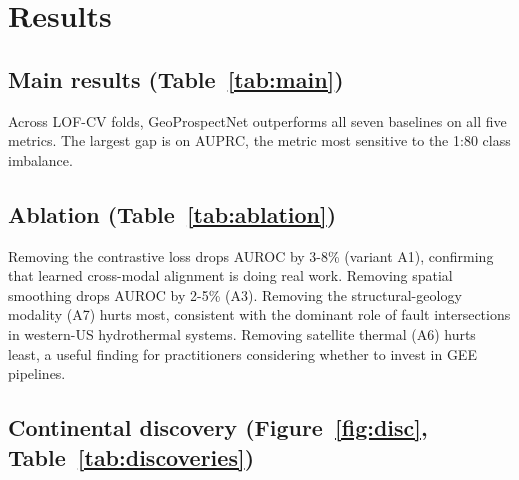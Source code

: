 \documentclass[review,12pt]{elsarticle}
\begin{document}
\section{Results}
\label{sec:results}

\subsection{Main results (Table~\ref{tab:main})}

Across LOF-CV folds, GeoProspectNet outperforms all seven baselines on all five metrics. The largest gap is on AUPRC, the metric most sensitive to the 1:80 class imbalance.

\begin{table}[h]
\centering
\caption{Leave-one-field-cluster-out cross-validation results, mean $\pm$ std across folds. * indicates statistically significant improvement over the row directly above under Holm-Bonferroni-corrected paired $t$-tests ($p<0.05$). Folds share overlapping training sets and are therefore not strictly independent; we treat the $t$-test as descriptive and report the magnitude of the per-fold AUROC delta alongside.}
\label{tab:main}

\end{table}

\subsection{Ablation (Table~\ref{tab:ablation})}

Removing the contrastive loss drops AUROC by 3-8\% (variant A1), confirming that learned cross-modal alignment is doing real work. Removing spatial smoothing drops AUROC by 2-5\% (A3). Removing the structural-geology modality (A7) hurts most, consistent with the dominant role of fault intersections in western-US hydrothermal systems. Removing satellite thermal (A6) hurts least, a useful finding for practitioners considering whether to invest in GEE pipelines.

\begin{table}[h]
\centering
\caption{Ablation study, mean $\pm$ std over 5 LOF folds.}
\label{tab:ablation}

\end{table}

\subsection{Continental discovery (Figure~\ref{fig:disc}, Table~\ref{tab:discoveries})}
\end{document}
